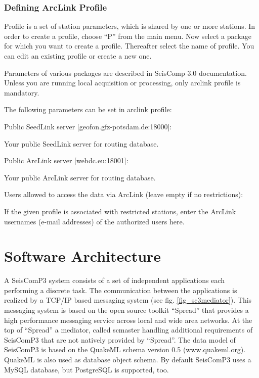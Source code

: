 \documentclass[11pt,a4paper,titlepage]{article}
\newcommand{\pkg}[1]{\textsf{#1}}
\begin{document}
\subsubsection{Defining ArcLink Profile}\label{profiles}

Profile is a set of station parameters, which is shared by one or more
stations. In order to create a profile, choose ``P'' from the main menu.
Now select a package for which you want to create a profile. Thereafter
select the name of profile. You can edit an existing profile or create a
new one.

Parameters of various packages are described in SeisComp 3.0 documentation.
Unless you are running local acquisition or processing, only \pkg{arclink}
profile is mandatory.

The following parameters can be set in \pkg{arclink} profile:
\begin{interface}
\item Public SeedLink server [geofon.gfz-potsdam.de:18000]:

Your public SeedLink server for routing database.

\item Public ArcLink server [webdc.eu:18001]:

Your public ArcLink server for routing database.

\item Users allowed to access the data via ArcLink (leave empty if no
restrictions):

If the given profile is associated with restricted stations, enter the
ArcLink usernames (e-mail addresses) of the authorized users here.
\end{interface}

\newpage


\section{Software Architecture}

A SeisComP3 system consists of a set of independent applications each performing a discrete task. The communication between the applications is realized by a TCP/IP based messaging system (see fig. \ref{fig_sc3mediator}). This messaging system is based on the open source toolkit “Spread” that provides a high performance messaging service across local and wide area networks. At the top of “Spread” a mediator, called scmaster handling additional requirements of SeisComP3 that are not natively provided by “Spread”. 
The data model of SeisComP3 is based on the QuakeML schema version 0.5 (www.quakeml.org). QuakeML is also used as database object schema. By default SeisComP3 uses a MySQL database, but PostgreSQL is supported, too.
\end{document}
